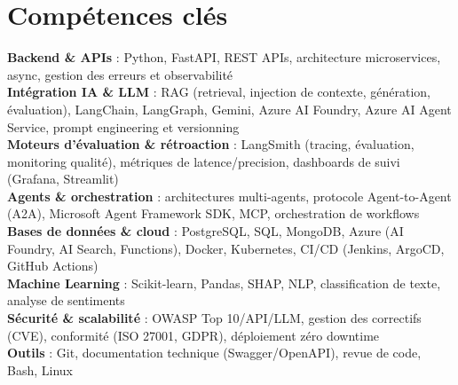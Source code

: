 \documentclass[a4paper,9pt]{article}
\begin{document}
\section{Compétences clés}
\textbf{Backend \& APIs} : Python, FastAPI, REST APIs, architecture microservices, async, gestion des erreurs et observabilité\\[0.3pt]
\textbf{Intégration IA \& LLM} : RAG (retrieval, injection de contexte, génération, évaluation), LangChain, LangGraph, Gemini, Azure AI Foundry, Azure AI Agent Service, prompt engineering et versionning\\[0.3pt]
\textbf{Moteurs d'évaluation \& rétroaction} : LangSmith (tracing, évaluation, monitoring qualité), métriques de latence/precision, dashboards de suivi (Grafana, Streamlit)\\[0.3pt]
\textbf{Agents \& orchestration} : architectures multi-agents, protocole Agent-to-Agent (A2A), Microsoft Agent Framework SDK, MCP, orchestration de workflows\\[0.3pt]
\textbf{Bases de données \& cloud} : PostgreSQL, SQL, MongoDB, Azure (AI Foundry, AI Search, Functions), Docker, Kubernetes, CI/CD (Jenkins, ArgoCD, GitHub Actions)\\[0.3pt]
\textbf{Machine Learning} : Scikit-learn, Pandas, SHAP, NLP, classification de texte, analyse de sentiments\\[0.3pt]
\textbf{Sécurité \& scalabilité} : OWASP Top 10/API/LLM, gestion des correctifs (CVE), conformité (ISO 27001, GDPR), déploiement zéro downtime\\[0.3pt]
\textbf{Outils} : Git, documentation technique (Swagger/OpenAPI), revue de code, Bash, Linux
\end{document}

